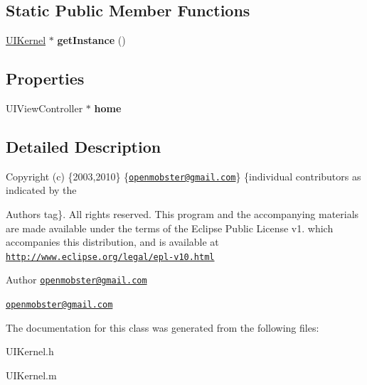 \subsection*{\-Static \-Public \-Member \-Functions}
\begin{DoxyCompactItemize}
\item 
\hypertarget{interface_u_i_kernel_a63c3e1e67f93e27d2d7d81d6328a6f70}{
\hyperlink{interface_u_i_kernel}{\-U\-I\-Kernel} $\ast$ {\bfseries get\-Instance} ()}
\label{interface_u_i_kernel_a63c3e1e67f93e27d2d7d81d6328a6f70}

\end{DoxyCompactItemize}
\subsection*{\-Properties}
\begin{DoxyCompactItemize}
\item 
\hypertarget{interface_u_i_kernel_a59b8011a6af9a4b3b958741be8455681}{
\-U\-I\-View\-Controller $\ast$ {\bfseries home}}
\label{interface_u_i_kernel_a59b8011a6af9a4b3b958741be8455681}

\end{DoxyCompactItemize}


\subsection{\-Detailed \-Description}
\-Copyright (c) \{2003,2010\} \{\href{mailto:openmobster@gmail.com}{\tt openmobster@gmail.\-com}\} \{individual contributors as indicated by the \begin{DoxyAuthor}{\-Authors}
tag\}. \-All rights reserved. \-This program and the accompanying materials are made available under the terms of the \-Eclipse \-Public \-License v1. which accompanies this distribution, and is available at \href{http://www.eclipse.org/legal/epl-v10.html}{\tt http\-://www.\-eclipse.\-org/legal/epl-\/v10.\-html}
\end{DoxyAuthor}
\begin{DoxyAuthor}{\-Author}
\href{mailto:openmobster@gmail.com}{\tt openmobster@gmail.\-com}

\href{mailto:openmobster@gmail.com}{\tt openmobster@gmail.\-com} 
\end{DoxyAuthor}


\-The documentation for this class was generated from the following files\-:\begin{DoxyCompactItemize}
\item 
\-U\-I\-Kernel.\-h\item 
\-U\-I\-Kernel.\-m\end{DoxyCompactItemize}
